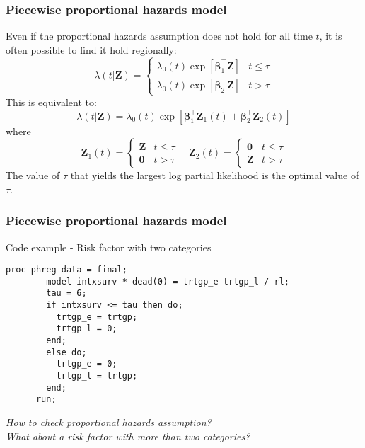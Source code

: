 \documentclass[11pt, aspectratio = 169]{beamer}
\begin{document}
\begin{frame}[fragile]
  \frametitle{Piecewise proportional hazards model}
  Even if the proportional hazards assumption does not hold for all time $t$, it is often possible to find it hold regionally:
  \begin{equation*}
    \lambda\left(t|\mathbf{Z}\right) =
    \begin{cases}
      \lambda_{0}(t)\exp\left[\boldsymbol{\beta}_1^\top\mathbf{Z}\right] & t \le \tau\\
      \lambda_{0}(t)\exp\left[\boldsymbol{\beta}_2^\top\mathbf{Z}\right] & t > \tau
    \end{cases}
  \end{equation*}
  This is equivalent to:
  \begin{equation*}
    \lambda\left(t|\mathbf{Z}\right) = \lambda_{0}(t)\exp\left[\boldsymbol{\beta}_1^\top\mathbf{Z}_1(t) + \boldsymbol{\beta}_2^\top\mathbf{Z}_2(t)\right]
  \end{equation*}
  where
  \begin{equation*}
    \mathbf{Z}_1(t) =
    \begin{cases}
      \mathbf{Z} & t \le \tau \\
      \mathbf{0} & t > \tau
    \end{cases}
    \quad \mathbf{Z}_2(t) =
    \begin{cases}
      \mathbf{0} & t \le \tau \\
      \mathbf{Z} & t > \tau
    \end{cases}
  \end{equation*}
  The value of $\tau$ that yields the largest log partial likelihood is the optimal value of $\tau$.
\end{frame}

\begin{frame}[fragile]
  \frametitle{Piecewise proportional hazards model}
  \begin{block}{Code example - Risk factor with two categories}
    \begin{lstlisting}[gobble = 6]
      proc phreg data = final;
        model intxsurv * dead(0) = trtgp_e trtgp_l / rl;
        tau = 6;
        if intxsurv <= tau then do;
          trtgp_e = trtgp;
          trtgp_l = 0;
        end;
        else do;
          trtgp_e = 0;
          trtgp_l = trtgp;
        end;
      run;
    \end{lstlisting}
  \end{block}
  \textit{How to check proportional hazards assumption? \\ What about a risk factor with more than two categories?}
\end{frame}
\end{document}
